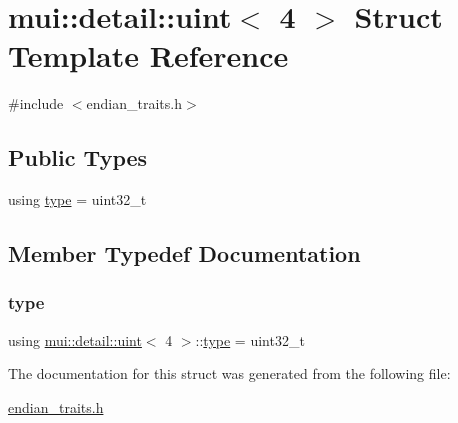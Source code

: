 \hypertarget{structmui_1_1detail_1_1uint_3_014_01_4}{}\section{mui\+:\+:detail\+:\+:uint$<$ 4 $>$ Struct Template Reference}
\label{structmui_1_1detail_1_1uint_3_014_01_4}


{\ttfamily \#include $<$endian\+\_\+traits.\+h$>$}

\subsection*{Public Types}
\begin{DoxyCompactItemize}
\item 
using \hyperlink{structmui_1_1detail_1_1uint_3_014_01_4_a2debfa49a6fa91bf0ef2a0e3f5082ddd}{type} = uint32\+\_\+t
\end{DoxyCompactItemize}


\subsection{Member Typedef Documentation}
\mbox{\label{structmui_1_1detail_1_1uint_3_014_01_4_a2debfa49a6fa91bf0ef2a0e3f5082ddd}} 
\subsubsection{\texorpdfstring{type}{type}}
{\footnotesize\ttfamily using \hyperlink{structmui_1_1detail_1_1uint}{mui\+::detail\+::uint}$<$ 4 $>$\+::\hyperlink{structmui_1_1detail_1_1uint_3_014_01_4_a2debfa49a6fa91bf0ef2a0e3f5082ddd}{type} =  uint32\+\_\+t}



The documentation for this struct was generated from the following file\+:\begin{DoxyCompactItemize}
\item 
\hyperlink{endian__traits_8h}{endian\+\_\+traits.\+h}\end{DoxyCompactItemize}
